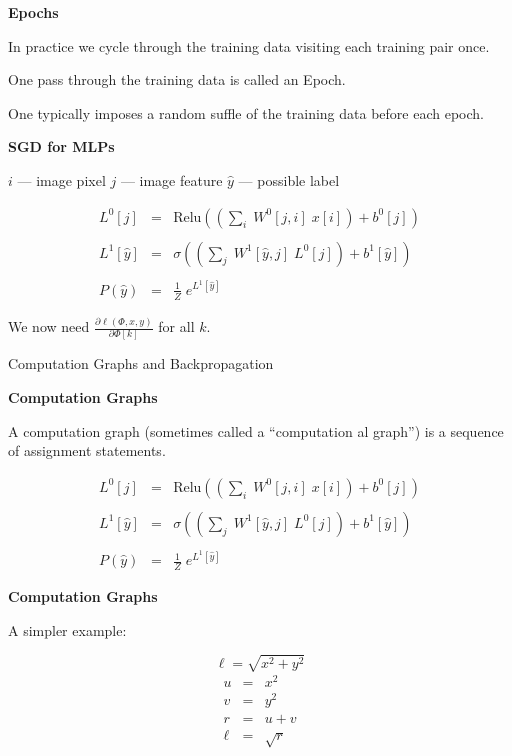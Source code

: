 \documentclass[landscape]{article}
\newcommand{\slide}[1]{
  \vfill
  \centerline{\Large\thepage}
  \eject
  \centerline{\bf #1}
  \vfill}
\begin{document}
{\slide{Epochs}

In practice we cycle through the training data visiting each training pair once.

\vfill
One pass through the training data is called an Epoch.

\vfill
One typically imposes a random suffle of the training data before each epoch.

\slide{SGD for MLPs}

\centerline{$i$ --- image pixel \hspace{4ex} $j$ --- image feature \hspace{4ex} $\hat{y}$ --- possible label}

\vfill
\begin{eqnarray*}
  L^0[j] & = & \mathrm{Relu}\left(\left(\sum_i\;W^0[j,i] \;x[i]\right) + b^0[j]\right) \\
  \\
  L^1[\hat{y}] & = & \sigma\left(\left(\sum_j\;W^1[\hat{y},j]\;L^0[j]\right) + b^1[\hat{y}]\right) \\
  \\
  P(\hat{y}) & = & \frac{1}{Z} \;e^{L^1[\hat{y}]}
\end{eqnarray*}

\vfill
We now need $\frac{\partial \ell(\Phi,x,y)}{\partial \Phi[k]}$ for all $k$.

\slide{}

\centerline{Computation Graphs and Backpropagation}

\vfill

\slide{Computation Graphs}

A computation graph (sometimes called a ``computation{\color{red} al} graph'') is a sequence of assignment statements.


\vfill
\begin{eqnarray*}
  L^0[j] & = & \mathrm{Relu}\left(\left(\sum_i\;W^0[j,i] \;x[i]\right) + b^0[j]\right) \\
  \\
  L^1[\hat{y}] & = & \sigma\left(\left(\sum_j\;W^1[\hat{y},j]\;L^0[j]\right) + b^1[\hat{y}]\right) \\
  \\
  P(\hat{y}) & = & \frac{1}{Z} \;e^{L^1[\hat{y}]}
\end{eqnarray*}

\slide{Computation Graphs}
A simpler example:

\vfill
$$\ell = \sqrt{x^2 + y^2}$$
\begin{eqnarray*}
  u & = & x^2  \\
  v & = & y^2 \\
  r & =& u + v \\
  \ell & = & \sqrt{r}
\end{eqnarray*}

}
\end{document}
